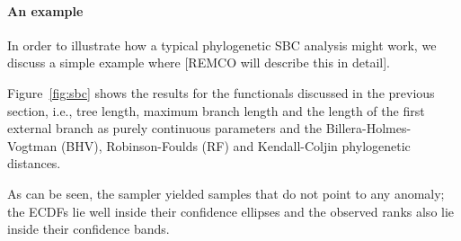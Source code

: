 \documentclass[oneside]{article}
\begin{document}
\paragraph{An example}

In order to illustrate how a typical phylogenetic SBC analysis might work, we discuss a simple example where [REMCO will describe this in detail].

Figure~\ref{fig:sbc} shows the results for the functionals discussed in the previous section, i.e., tree length, maximum branch length and the length of the first external branch as purely continuous parameters and the Billera-Holmes-Vogtman (BHV), Robinson-Foulds (RF) and Kendall-Coljin phylogenetic distances.

As can be seen, the sampler yielded samples that do not point to any anomaly; the ECDFs lie well inside their confidence ellipses and the observed ranks also lie inside their confidence bands.
\end{document}
